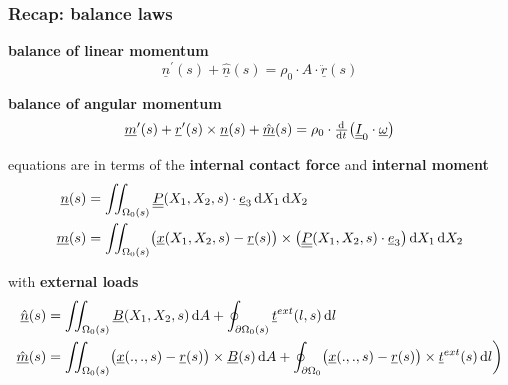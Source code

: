 \begin{frame}
  \frametitle{Recap: balance laws}

  \textbf{balance of linear momentum}
  \begin{displaymath}
    \underline{n}^{\prime}(s) + \underline{\hat{n}}(s) =
    \rho_0 \cdot A \cdot \underline{\ddot{r}}(s)
  \end{displaymath}
  
  \vspace{0.5em}
  \textbf{balance of angular momentum}
  \begin{displaymath}
    \underline{m}^{\prime}(s) + \underline{r}^{\prime}(s) \times \underline{n}(s) + \underline{\hat{m}}(s) =
    \rho_0 \cdot
    \od{}{t} \bigl( \doubleunderline{I}_0 \cdot \underline{\omega} \bigr)
  \end{displaymath}
  
  \vspace{0.5em}
  equations are in terms of the \textbf{internal contact force} and \textbf{internal moment}
  \begin{displaymath}
    \begin{alignedat}{1}
      \underline{n}(s) &= \iint_{\Omega_0(s)} \doubleunderline{P}(X_1, X_2, s) \cdot \underline{e}_3 \dif X_1 \dif X_2 \\
      \underline{m}(s) &= \iint_{\Omega_0(s)} \bigl( \underline{x}(X_1,X_2,s) - \underline{r}(s) \bigr) \times \bigl( \doubleunderline{P}(X_1,X_2,s) \cdot \underline{e}_3 \bigr) \dif X_1 \dif X_2 %
    \end{alignedat}
  \end{displaymath}
  
  \vspace{0.5em}
  with \textbf{external loads}
  \begin{displaymath}
    \begin{alignedat}{1}
      \underline{\hat{n}}(s) &= \iint_{\Omega_{0}(s)} \underline{B}(X_1,X_2,s) \dif A + \oint_{\partial \Omega_{0}(s)} \underline{t}^{ext}(l,s) \dif l \\
      \underline{\hat{m}}(s) &= \iint_{\Omega_{0}(s)} \bigl( \underline{x}(.,.,s) - \underline{r}(s) \bigr) \times \underline{B}(s) \dif A + \oint_{\partial \Omega_0} \bigl( \underline{x}(.,.,s) - \underline{r}(s) \bigr) \times \underline{t}^{ext}(s) \dif l \biggr)
    \end{alignedat}
  \end{displaymath}
  
\end{frame}

